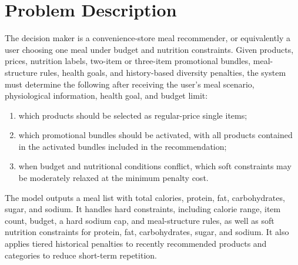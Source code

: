 \documentclass[a4paper]{article}
\begin{document}
\section{Problem Description}
The decision maker is a convenience-store meal recommender, or equivalently a user choosing one meal under budget and nutrition constraints. Given products, prices, nutrition labels, two-item or three-item promotional bundles, meal-structure rules, health goals, and history-based diversity penalties, the system must determine the following after receiving the user's meal scenario, physiological information, health goal, and budget limit:
\begin{enumerate}
\item which products should be selected as regular-price single items;
\item which promotional bundles should be activated, with all products contained in the activated bundles included in the recommendation;
\item when budget and nutritional conditions conflict, which soft constraints may be moderately relaxed at the minimum penalty cost.
\end{enumerate}

The model outputs a meal list with total calories, protein, fat, carbohydrates, sugar, and sodium. It handles hard constraints, including calorie range, item count, budget, a hard sodium cap, and meal-structure rules, as well as soft nutrition constraints for protein, fat, carbohydrates, sugar, and sodium. It also applies tiered historical penalties to recently recommended products and categories to reduce short-term repetition.
\end{document}
